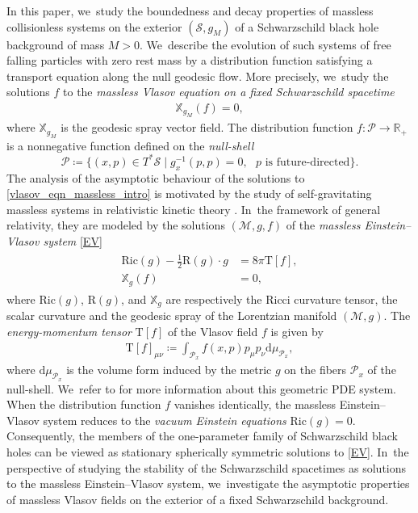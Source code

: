 \documentclass[JEP,XML,SOM,Unicode,published]{cedram}
\theoremstyle{plain}
\theoremstyle{definition}
\newcommand\R{{\mathbb{R}}}
\newcommand\T{{\mathbb{X}}}
\newcommand\dr{{\mathrm{d}}}
\begin{document}
In this paper, we~study the boundedness and decay properties of massless collisionless systems on the exterior $(\mathcal{S},g_M)$ of a Schwarzschild black hole background of mass $M>0$. We~describe the evolution of such systems of free falling particles with zero rest mass by a distribution function satisfying a transport equation along the null geodesic flow. More precisely, we~study the solutions $f$ to the \emph{massless Vlasov equation on a fixed Schwarzschild spacetime}
\begin{align}\label{vlasov_eqn_massless_intro}
\T_{g_M}(f)=0,
\end{align}
where $\T_{g_M}$ is the geodesic spray vector field. The distribution function $f \colon \mathcal{P }\to \R_+$ is a nonnegative function defined on the \emph{null-shell}
\begin{equation}\label{def_first_intro_null_shell}
\mathcal{P} \coloneqq \bigl\{ (x,p)\in T^*\mathcal{S}\mid g_x^{-1}(p,p)=0,\text{ $p$ is future-directed} \bigr\}.
\end{equation}
The analysis of the asymptotic behaviour of the solutions to \eqref{vlasov_eqn_massless_intro} is motivated by the study of self-gravitating massless systems in relativistic kinetic theory \cite{A11,AGS}. In~the framework of general relativity, they are modeled by the solutions $(\mathcal{M},g,f)$ of the \emph{massless Einstein--Vlasov system} \eqref{EV}
\begin{align} \tag{EV}
\begin{aligned}\label{EV}
\mathrm{Ric}(g)-\frac{1}{2}\mathrm{R}(g)\cdot g&=8\pi \mathrm{T}[f],\\
\T_g(f)&=0,
\end{aligned}
\end{align}
where $\mathrm{Ric}(g)$, $\mathrm{R}(g)$, and $\T_g$ are respectively the Ricci curvature tensor, the scalar curvature and the geodesic spray of the Lorentzian manifold $(\mathcal{M},g)$. The \emph{energy-momentum tensor} $\mathrm{T}[f]$ of the Vlasov field $f$ is given by
\begin{align} \label{energy_momentum_local_geometry_intro}
\mathrm{T} [f]_{ \mu \nu } \coloneqq \int_{\mathcal{P}_x} f(x,p) p_\mu p_\nu \dr \mu_{\mathcal{P}_x},
\end{align}
where $\dr \mu_{\mathcal{P}_x}$ is the volume form induced by the metric $g$ on the fibers $\mathcal{P}_x$ of the null-shell. We~refer to \cite{AR08,CB09,A11} for more information about this geometric PDE system. When the distribution function $f$ vanishes identically, the massless Einstein--Vlasov system reduces to the \emph{vacuum Einstein equations} $\mathrm{Ric}(g)\!=\!0$. Consequently, the members of the one-parameter family of Schwarzschild black holes can be viewed as stationary spherically symmetric solutions to \eqref{EV}. In~the perspective of studying the stability of the Schwarzschild spacetimes as solutions to the massless Einstein--Vlasov system, we~investigate the asymptotic properties of massless Vlasov fields on the exterior of a fixed Schwarzschild background.
\end{document}
